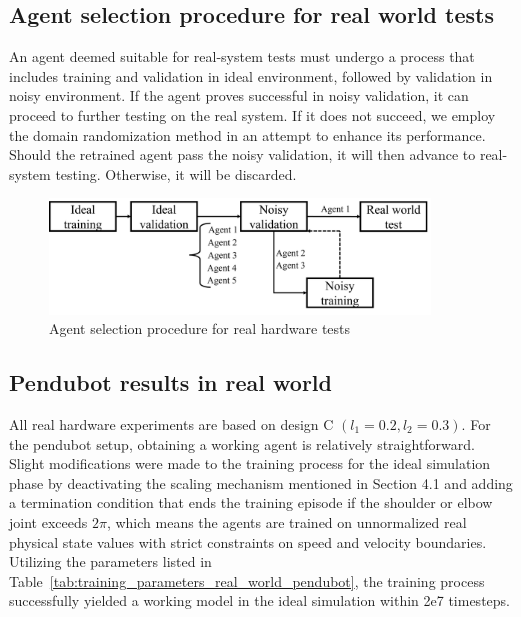 \subsection{Agent selection procedure for real world tests}
An agent deemed suitable for real-system tests must undergo a process that includes training and validation in ideal environment, followed by validation in noisy environment. If the agent proves successful in noisy validation, it can proceed to further testing on the real system. If it does not succeed, we employ the domain randomization method in an attempt to enhance its performance. Should the retrained agent pass the noisy validation, it will then advance to real-system testing. Otherwise, it will be discarded.

\begin{figure}[H]
    \centering
    \includegraphics[width=0.9\textwidth]{figures/hardware_result/agent_selection_procedure.png}%
    \caption{Agent selection procedure for real hardware tests}
    \label{fig:agent_selection}
\end{figure}

\subsection{Pendubot results in real world}
All real hardware experiments are based on design C \( (l_1 = 0.2, l_2 = 0.3) \). For the pendubot setup, obtaining a working agent is relatively straightforward. Slight modifications were made to the training process for the ideal simulation phase by deactivating the scaling mechanism mentioned in Section 4.1 and adding a termination condition that ends the training episode if the shoulder or elbow joint exceeds \( 2\pi \), which means the agents are trained on unnormalized real physical state values with strict constraints on speed and velocity boundaries. Utilizing the parameters listed in Table~\ref{tab:training_parameters_real_world_pendubot}, the training process successfully yielded a working model in the ideal simulation within 2e7 timesteps.

